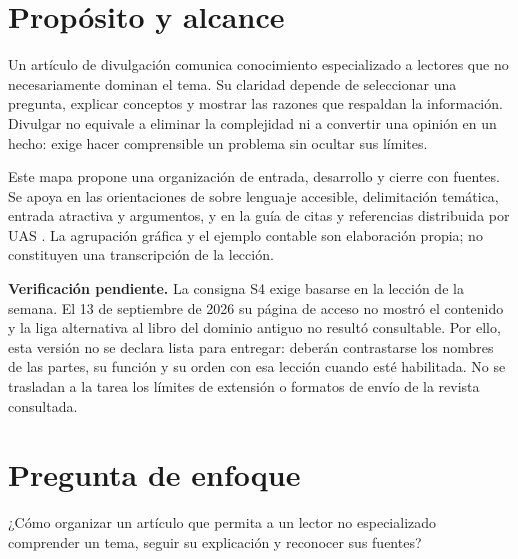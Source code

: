 


\section{Propósito y alcance}
Un artículo de divulgación comunica conocimiento especializado a lectores que no necesariamente dominan el tema. Su claridad depende de seleccionar una pregunta, explicar conceptos y mostrar las razones que respaldan la información. Divulgar no equivale a eliminar la complejidad ni a convertir una opinión en un hecho: exige hacer comprensible un problema sin ocultar sus límites.

Este mapa propone una organización de entrada, desarrollo y cierre con fuentes. Se apoya en las orientaciones de \textcite{comovesautores} sobre lenguaje accesible, delimitación temática, entrada atractiva y argumentos, y en la guía de citas y referencias distribuida por UAS \parencite{guiaapa}. La agrupación gráfica y el ejemplo contable son elaboración propia; no constituyen una transcripción de la lección.

\noindent\textbf{Verificación pendiente.} La consigna S4 exige basarse en la lección de la semana. El 13 de septiembre de 2026 su página de acceso no mostró el contenido y la liga alternativa al libro del dominio antiguo no resultó consultable. Por ello, esta versión no se declara lista para entregar: deberán contrastarse los nombres de las partes, su función y su orden con esa lección cuando esté habilitada. No se trasladan a la tarea los límites de extensión o formatos de envío de la revista consultada.

\section{Pregunta de enfoque}
¿Cómo organizar un artículo que permita a un lector no especializado comprender un tema, seguir su explicación y reconocer sus fuentes?

